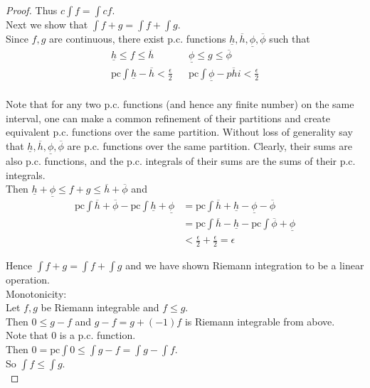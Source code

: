 \documentclass[12pt]{article}
\begin{document}
\begin{proof}
		Thus $c \int f = \int cf$. \\
		
		Next we show that $\int f +g = \int f + \int g$. \\
		
		Since $f,g$ are continuous, there exist p.c. functions $\underline{h}, \overline{h}, \underline{\phi}, \overline{\phi}$ such that \\
		\begin{align*}
			\underline{h} \leq f \leq \overline{h} &  &\underline{\phi} \leq g \leq \overline{\phi} \\
			\text{pc}\int \underline{h} - \overline{h} < \frac{\epsilon}{2} &  & \text{pc}\int \underline{\phi} - \overline{phi} < \frac{\epsilon}{2} \\
		\end{align*}
		
		Note that for any two p.c. functions (and hence any finite number) on the same interval, one can make a common refinement of their partitions and create equivalent p.c. functions over the same partition. Without loss of generality say that $\underline{h}, \overline{h}, \underline{\phi}, \overline{\phi}$ are p.c. functions over the same partition. Clearly, their sums are also p.c. functions, and the p.c. integrals of their sums are the sums of their p.c. integrals. \\
		
		Then  $\underline{h} + \underline{\phi} \leq f +g  \leq \overline{h} + \overline{\phi}$ and \\
		\begin{align*}
			\text{pc}\int \overline{h} + \overline{\phi} - \text{pc}\int  \underline{h} + \underline{\phi} & = \text{pc}\int \overline{h} + \underline{h} - \underline{\phi} - \overline{\phi} \\
			& = \text{pc}\int \overline{h} - \underline{h} - \text{pc}\int  \overline{\phi} + \underline{\phi} \\
			& < \frac{\epsilon}{2} +\frac{\epsilon}{2} = \epsilon
		\end{align*}
		
		Hence $\int f +g = \int f + \int g$ and we have shown Riemann integration to be a linear operation.\\
		
		Monotonicity: \\
		
		Let $f,g$ be Riemann integrable and $f \leq g$. \\
		Then $0 \leq g-f$ and $g-f = g + (-1)f$ is Riemann integrable from above. \\
		Note that $0$ is a p.c. function. \\
		Then $0 = \text{pc}\int 0 \leq \int g-f = \int g - \int f$. \\
		So $\int f \leq \int g$. \\		
	\end{proof}
\end{document}
